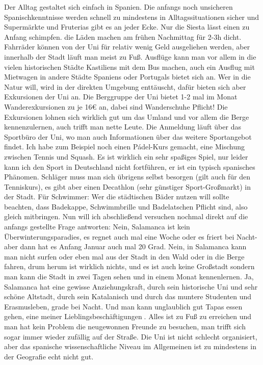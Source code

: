 Der Alltag gestaltet sich einfach in Spanien. Die anfangs noch unsicheren Spanischkenntnisse werden schnell zu mindestens in Alltagssituationen sicher und Supermärkte und Fruterias gibt es an jeder Ecke. Nur die Siesta lässt einen zu Anfang schimpfen. die Läden machen am frühen Nachmittag für 2-3h dicht. Fahrräder können von der Uni für relativ wenig Geld ausgeliehen werden, aber innerhalb der Stadt läuft man meist zu Fuß. 
Ausflüge kann man vor allem in die vielen historischen Städte Kastiliens mit dem Bus machen, auch ein Ausflug mit Mietwagen in andere Städte Spaniens oder Portugals bietet sich an. Wer in die Natur will, wird in der direkten Umgebung enttäuscht, dafür bieten sich aber Exkursionen der Uni an. Die Berggruppe der Uni bietet 1-2 mal im Monat Wanderexkursionen zu je 16€ an, dabei sind Wanderschuhe Pflicht! Die Exkursionen lohnen sich wirklich gut um das Umland und vor allem die 
Berge kennenzulernen, auch trifft man nette Leute. Die Anmeldung läuft über das Sportbüro der Uni, wo man auch Informationen über das weitere Sportangebot findet. Ich habe zum Beispiel noch einen Pádel-Kurs gemacht, eine Mischung zwischen Tennis und Squash. Es ist wirklich ein sehr spaßiges Spiel, nur leider kann ich den Sport in Deutschland nicht fortführen, er ist ein typisch spanisches Phänomen. Schläger muss man sich übrigens selbst besorgen (gilt auch für den Tenniskurs), es gibt aber einen Decathlon (sehr günstiger Sport-Großmarkt) in der Stadt. Für Schwimmer: Wer die städtischen Bäder nutzen will sollte beachten, dass Badekappe, Schwimmbrille und Badelatschen Pflicht sind, also gleich mitbringen. 
Nun will ich abschließend versuchen nochmal direkt auf die anfangs gestellte Frage antworten: Nein, Salamanca ist kein Überwinterungsparadies, es regnet auch mal eine Woche oder es friert bei Nacht- aber dann hat es Anfang Januar auch mal 20 Grad. Nein, in Salamanca kann man nicht surfen oder eben mal aus der Stadt in den Wald oder in die Berge fahren, drum herum ist wirklich nichts, und es ist auch keine Großstadt sondern man kann die Stadt in zwei Tagen sehen und in einem Monat kennenlernen. 
Ja, Salamanca hat eine gewisse Anziehungskraft, durch sein historische Uni und sehr schöne Altstadt, durch sein Katalanisch und durch das muntere Studenten und Erasmusleben, grade bei Nacht. Und man kann unglaublich gut Tapas essen gehen, eine meiner Lieblingsbeschäftigungen. Alles ist zu Fuß zu erreichen und man hat kein Problem die neugewonnen Freunde zu besuchen, man trifft sich sogar immer wieder zufällig auf der Straße. Die Uni ist nicht schlecht organisiert, aber das spanische wissenschaftliche Niveau im Allgemeinen ist zu mindestens in der Geografie echt nicht gut. 
